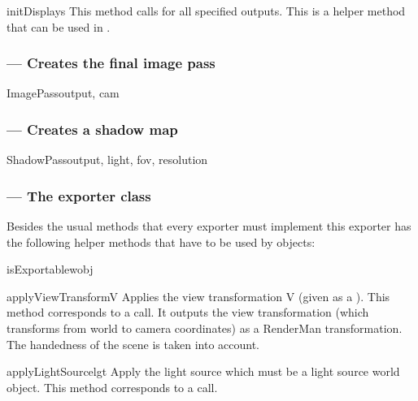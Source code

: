 \begin{methoddesc}{initDisplays}{}
This method calls  for all specified outputs.
This is a helper method that can be used in .
\end{methoddesc}

\subsubsection{ --- Creates the final image pass}

\begin{classdesc}{ImagePass}{output, cam}
	
\end{classdesc}

\subsubsection{ --- Creates a shadow map}

\begin{classdesc}{ShadowPass}{output, light, fov, resolution}
	
\end{classdesc}


\subsubsection{ --- The exporter class}

Besides the usual methods that every exporter must implement this exporter
has the following helper methods that have to be used by 
objects:

\begin{methoddesc}[RIBExporter]{isExportable}{wobj}
\end{methoddesc}

\begin{methoddesc}[RIBExporter]{applyViewTransform}{V}
Applies the view transformation V (given as a ). This
method corresponds to a
 call. It outputs the view transformation 
 (which transforms from world to camera coordinates) as a RenderMan 
transformation. The handedness of the scene is taken into account.
\end{methoddesc}

\begin{methoddesc}[RIBExporter]{applyLightSource}{lgt}
Apply the light source  which must be a light source world
object. This method corresponds to a  call.
\end{methoddesc}

